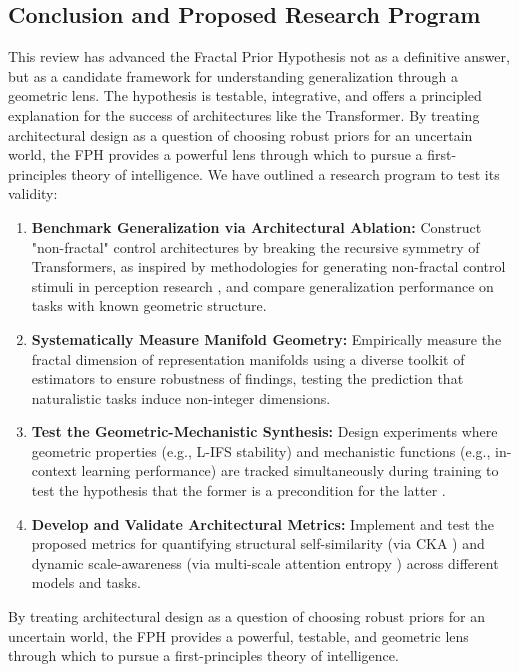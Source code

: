 \documentclass[11pt,a4paper]{article}
\begin{document}
\subsection{Conclusion and Proposed Research Program}
This review has advanced the Fractal Prior Hypothesis not as a definitive answer, but as a candidate framework for understanding generalization through a geometric lens. The hypothesis is testable, integrative, and offers a principled explanation for the success of architectures like the Transformer. By treating architectural design as a question of choosing robust priors for an uncertain world, the FPH provides a powerful lens through which to pursue a first-principles theory of intelligence. We have outlined a research program to test its validity:
\begin{enumerate}
    \item \textbf{Benchmark Generalization via Architectural Ablation:} Construct "non-fractal" control architectures by breaking the recursive symmetry of Transformers, as inspired by methodologies for generating non-fractal control stimuli in perception research \citep{spehar2023perceptual}, and compare generalization performance on tasks with known geometric structure.
    \item \textbf{Systematically Measure Manifold Geometry:} Empirically measure the fractal dimension of representation manifolds using a diverse toolkit of estimators \citep{fass2023estimating} to ensure robustness of findings, testing the prediction that naturalistic tasks induce non-integer dimensions.
    \item \textbf{Test the Geometric-Mechanistic Synthesis:} Design experiments where geometric properties (e.g., L-IFS stability) and mechanistic functions (e.g., in-context learning performance) are tracked simultaneously during training to test the hypothesis that the former is a precondition for the latter \citep{garg2022what, chan2023transient}.
    \item \textbf{Develop and Validate Architectural Metrics:} Implement and test the proposed metrics for quantifying structural self-similarity (via CKA \citep{kornblith2019similarity}) and dynamic scale-awareness (via multi-scale attention entropy \citep{costa2022multiscale}) across different models and tasks.
\end{enumerate}
By treating architectural design as a question of choosing robust priors for an uncertain world, the FPH provides a powerful, testable, and geometric lens through which to pursue a first-principles theory of intelligence.



\end{document}
